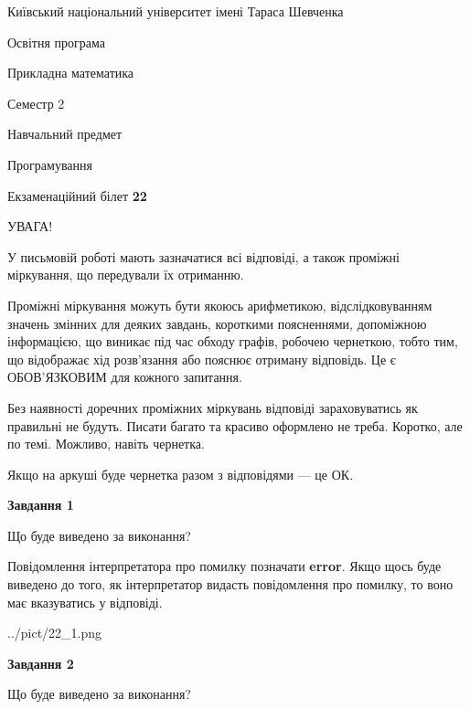 \documentclass[12pt, ukrainian]{article}
\begin{document}
{{\begin {small}\par
{ \center  Київський національний університет імені Тараса Шевченка \par}
{\parbox {5 cm}{Освітня програма \hfill}{\parbox {7 cm}{Прикладна математика \hfill}}\parbox {6 cm}{\hfill Семестр 2}}\par
{\parbox {5 cm} {Навчальний предмет \hfill}\parbox {7 cm}{Програмування \hfill}\parbox {6cm}{\hfill}\par}\vspace{-7pt} \end{small}}{\center Екзаменаційний білет \No \textbf
{ 22 }\par}}
{
\begin {large}
УВАГА!

У письмовій роботі мають зазначатися всі відповіді, а також проміжні міркування, що передували їх отриманню.

Проміжні міркування можуть бути якоюсь арифметикою, відслідковуванням зна\-чень змінних для деяких завдань,
короткими поясненнями, допоміжною інформацією, що виникає під час обходу графів, робочею чернеткою,
тобто тим, що відображає хід розв’язання або пояснює отриману відповідь.
Це є ОБОВ’ЯЗКОВИМ для кожного запитання.

Без наявності доречних проміжних міркувань відповіді зараховуватись як правиль\-ні не будуть.
Писати багато та красиво оформлено не треба. Коротко, але по темі. Можли\-во, навіть чернетка.

Якщо на аркуші буде чернетка разом з відповідями --- це ОК.

\newpage

{\begin {center}\textbf{Завдання 1}\end {center}}\par
Що буде виведено за виконання?

Повідомлення інтерпретатора про помилку позначати \textbf{error}.
Якщо щось буде виведено до того, як інтерпретатор видасть повідомлення про помилку, 
то воно має вказуватись у відповіді. \par


\begin{center}
	{../pict/22_1.png}
\end{center}
\newpage

{\begin {center}\textbf{Завдання 2}\end {center}}\par
Що буде виведено за виконання?


\end{large}}
\end{document}
